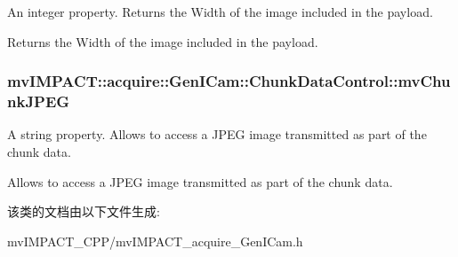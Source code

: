 An integer property. Returns the Width of the image included in the payload. 

Returns the Width of the image included in the payload. \hypertarget{classmv_i_m_p_a_c_t_1_1acquire_1_1_gen_i_cam_1_1_chunk_data_control_a78076131ba88ad24c78eb473d10ae3f6}{
\subsubsection[{mv\+Chunk\+J\+P\+E\+G}]{ mv\+I\+M\+P\+A\+C\+T\+::acquire\+::\+Gen\+I\+Cam\+::\+Chunk\+Data\+Control\+::mv\+Chunk\+J\+P\+E\+G}}\label{classmv_i_m_p_a_c_t_1_1acquire_1_1_gen_i_cam_1_1_chunk_data_control_a78076131ba88ad24c78eb473d10ae3f6}


A string property. Allows to access a J\+P\+E\+G image transmitted as part of the chunk data. 

Allows to access a J\+P\+E\+G image transmitted as part of the chunk data. 

该类的文档由以下文件生成\+:\begin{DoxyCompactItemize}
\item 
mv\+I\+M\+P\+A\+C\+T\+\_\+\+C\+P\+P/mv\+I\+M\+P\+A\+C\+T\+\_\+acquire\+\_\+\+Gen\+I\+Cam.\+h\end{DoxyCompactItemize}
